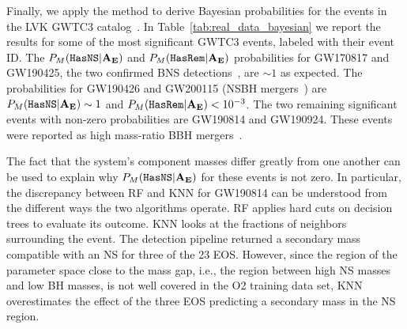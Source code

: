 Finally, we apply the method to derive Bayesian probabilities for the events in the \ac{LVK} \ac{GWTC3} catalog~\cite{LIGOScientific:2020ibl, LIGOScientific:2021djp}.  In
Table~\ref{tab:real_data_bayesian} we report the results for some of the most significant \ac{GWTC3} events, labeled with their event ID. The $P_M({{\tt HasNS}} |\bf{A_E})$ and $P_M({{\tt HasRem}} |\bf{A_E})$ probabilities for GW170817 and GW190425, the two confirmed \ac{BNS}
detections~\cite{LIGOScientific:2020ibl,LIGOScientific:2021djp}, are $\sim 1$ as expected.  The probabilities for GW190426 and GW200115 (\ac{NSBH} mergers~\cite{LIGOScientific:2020ibl,
LIGOScientific:2021djp}) are $P_M({{\tt HasNS}} |{\bf{A_E}}) \sim 1$ and $P_M({{\tt HasRem}} |{\bf{A_E}}) < 10^{-3}$. The two remaining significant events with non-zero probabilities are GW190814 and
GW190924. These events were reported as high mass-ratio BBH mergers~\cite{LIGOScientific:2020ibl, LIGOScientific:2021djp}. 

The fact that the system's component masses differ greatly from one another can be used to explain why $P_M({{\tt HasNS}} |\bf{A_E})$ for these events is not zero. In particular, the discrepancy
between \ac{RF} and \ac{KNN} for GW190814 can be understood from the different ways the two algorithms operate. \ac{RF} applies hard cuts on decision trees to evaluate its outcome. \ac{KNN}
looks at the fractions of neighbors surrounding the event. The detection pipeline returned a secondary mass compatible with an \ac{NS} for three of the 23 \ac{EOS}. However, since the region of
the parameter space close to the mass gap, i.e., the region between high \ac{NS} masses and low \ac{BH} masses, is not well covered in the \ac{O2} training data set, \ac{KNN} overestimates the
effect of the three \ac{EOS} predicting a secondary mass in the \ac{NS} region. 

